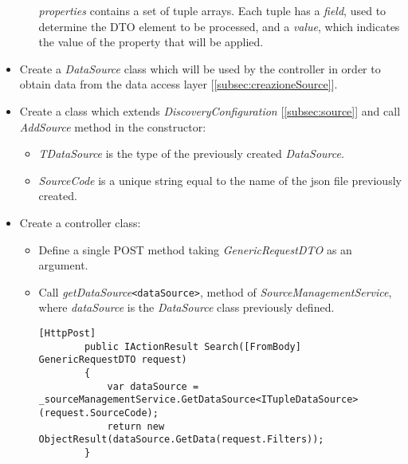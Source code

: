 \begin{itemize}
\begin{itemize}
     \textit{properties} contains a set of tuple arrays. Each tuple has a \textit{field}, used to determine the DTO element to be processed, and a \textit{value}, which indicates the value of the property that will be applied.
    \end{itemize}
    \item Create a \textit{DataSource} class which will be used by the controller in order to obtain data from the data access layer [\ref{subsec:creazioneSource}].
    \item Create a class which extends \textit{DiscoveryConfiguration} [\ref{subsec:source}] and call \textit{AddSource} method in the constructor:
        \begin{itemize}
            
            \begin{lstlisting}[caption={TupleDiscoveryConfiguration example}, style=javaScriptCode]
public class TupleDiscoveryConfiguration : DiscoveryConfiguration
    {
        public TupleDiscoveryConfiguration()
        {
            AddSource(new SourceInfo
            {
                TDataSource = typeof(AllRefusedDataSource),
                SourceCode = "allcode",
                LongText = "All refused",
                ShortText = "All refused"
            });

            AddSource(new SourceInfo
            {
                TDataSource = typeof(RefusedTypeDataSource),
                SourceCode = "refusedtype",
                LongText = "Refused type",
                ShortText = "Refused type"
            });
        }
    }                
            \end{lstlisting}
            \item \textit{TDataSource} is the type of the previously created \textit{DataSource}.
            \item \textit{SourceCode} is a unique string equal to the name of the json file previously created.
        \end{itemize}
    \item Create a controller class:
    \begin{itemize}
        \item Define a single POST method taking \textit{GenericRequestDTO} as an argument.
        \item Call \textit{getDataSource}\verb|<dataSource>|, method of \textit{SourceManagementService}, where \textit{dataSource} is the \textit{DataSource} class previously defined.
        \begin{lstlisting}[caption={HttpPost request in Controller example}, style=javaScriptCode]
        [HttpPost]
        public IActionResult Search([FromBody] GenericRequestDTO request)
        {
            var dataSource = _sourceManagementService.GetDataSource<ITupleDataSource>(request.SourceCode);
            return new ObjectResult(dataSource.GetData(request.Filters));
        }
        \end{lstlisting}
    \end{itemize}
\end{itemize}
